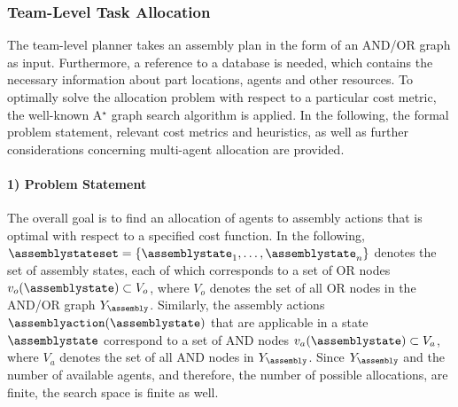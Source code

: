 \subsubsection{Team-Level Task Allocation}

The team-level planner takes an assembly plan in the form of an AND/OR graph as input.
Furthermore, a reference to a database is needed, which contains the necessary information about part locations, agents and other resources.
To optimally solve the allocation problem with respect to a particular cost metric, the well-known A$^\star$ graph search algorithm \cite{Russel.2002} is applied.
In the following, the formal problem statement, relevant cost metrics and heuristics, as well as further considerations concerning multi-agent allocation are provided.

\paragraph{1) Problem Statement}

The overall goal is to find an allocation of agents to assembly actions that is optimal with respect to a specified cost function.
In the following, $\assemblystateset=\{\assemblystate_1,\dots,\assemblystate_n\}$ denotes the set of assembly states, each of which corresponds to a set of OR nodes $v_o(\assemblystate)\subset V_o$, where $V_o$ denotes the set of all OR nodes in the AND/OR graph $Y_\assembly$.
Similarly, the assembly actions $\assemblyaction(\assemblystate)$ that are applicable in a state $\assemblystate$ correspond to a set of AND nodes $v_a(\assemblystate)\subset V_a$, where $V_a$ denotes the set of all AND nodes in $Y_\assembly$.
Since $Y_\assembly$ and the number of available agents, and therefore, the number of possible allocations, are finite, the search space is finite as well.

